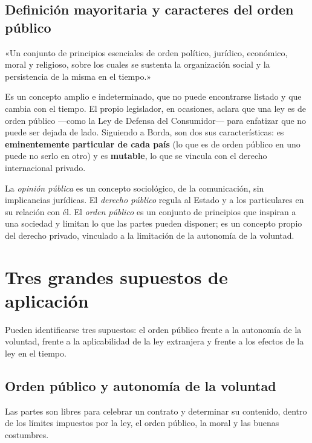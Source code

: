 \documentclass[12pt,oneside]{book}
\begin{document}
\subsection{Definición mayoritaria y caracteres del orden público}

\begin{definicion}
«Un conjunto de principios esenciales de orden político, jurídico, económico, moral y religioso, sobre los cuales se sustenta la organización social y la persistencia de la misma en el tiempo.»
\end{definicion}

Es un concepto amplio e indeterminado, que no puede encontrarse listado y que cambia con el tiempo. El propio legislador, en ocasiones, aclara que una ley es de orden público ---como la Ley de Defensa del Consumidor--- para enfatizar que no puede ser dejada de lado. Siguiendo a Borda, son dos sus características: es \textbf{eminentemente particular de cada país} (lo que es de orden público en uno puede no serlo en otro) y es \textbf{mutable}, lo que se vincula con el derecho internacional privado.

\begin{nota}
La \textit{opinión pública} es un concepto sociológico, de la comunicación, sin implicancias jurídicas. El \textit{derecho público} regula al Estado y a los particulares en su relación con él. El \textit{orden público} es un conjunto de principios que inspiran a una sociedad y limitan lo que las partes pueden disponer; es un concepto propio del derecho privado, vinculado a la limitación de la autonomía de la voluntad.
\end{nota}

\section{Tres grandes supuestos de aplicación}

Pueden identificarse tres supuestos: el orden público frente a la autonomía de la voluntad, frente a la aplicabilidad de la ley extranjera y frente a los efectos de la ley en el tiempo.

\subsection{Orden público y autonomía de la voluntad}

\begin{regla}
Las partes son libres para celebrar un contrato y determinar su contenido, dentro de los límites impuestos por la ley, el orden público, la moral y las buenas costumbres.
\end{regla}
\end{document}
